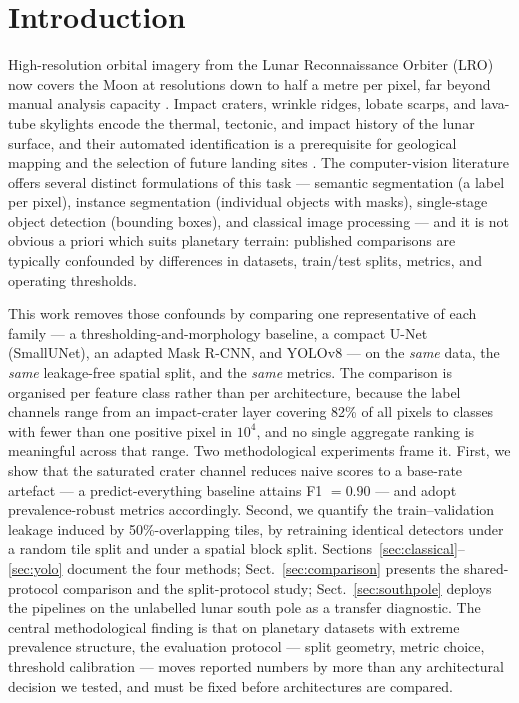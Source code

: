 \section{Introduction}
\label{sec:introduction}

High-resolution orbital imagery from the Lunar Reconnaissance Orbiter (LRO) now covers the Moon at resolutions down to half a metre per pixel, far beyond manual analysis capacity \citep{lroc_usgs}. Impact craters, wrinkle ridges, lobate scarps, and lava-tube skylights encode the thermal, tectonic, and impact history of the lunar surface, and their automated identification is a prerequisite for geological mapping and the selection of future landing sites \citep{pia12954,nasa2023southpole}. The computer-vision literature offers several distinct formulations of this task --- semantic segmentation (a label per pixel), instance segmentation (individual objects with masks), single-stage object detection (bounding boxes), and classical image processing --- and it is not obvious a priori which suits planetary terrain: published comparisons are typically confounded by differences in datasets, train/test splits, metrics, and operating thresholds.

This work removes those confounds by comparing one representative of each family --- a thresholding-and-morphology baseline, a compact U-Net (SmallUNet), an adapted Mask R-CNN, and YOLOv8 --- on the \emph{same} data, the \emph{same} leakage-free spatial split, and the \emph{same} metrics. The comparison is organised per feature class rather than per architecture, because the label channels range from an impact-crater layer covering 82\% of all pixels to classes with fewer than one positive pixel in $10^{4}$, and no single aggregate ranking is meaningful across that range. Two methodological experiments frame it. First, we show that the saturated crater channel reduces naive scores to a base-rate artefact --- a predict-everything baseline attains F1 $=0.90$ --- and adopt prevalence-robust metrics accordingly. Second, we quantify the train--validation leakage induced by 50\%-overlapping tiles, by retraining identical detectors under a random tile split and under a spatial block split. Sections~\ref{sec:classical}--\ref{sec:yolo} document the four methods; Sect.~\ref{sec:comparison} presents the shared-protocol comparison and the split-protocol study; Sect.~\ref{sec:southpole} deploys the pipelines on the unlabelled lunar south pole as a transfer diagnostic. The central methodological finding is that on planetary datasets with extreme prevalence structure, the evaluation protocol --- split geometry, metric choice, threshold calibration --- moves reported numbers by more than any architectural decision we tested, and must be fixed before architectures are compared.
